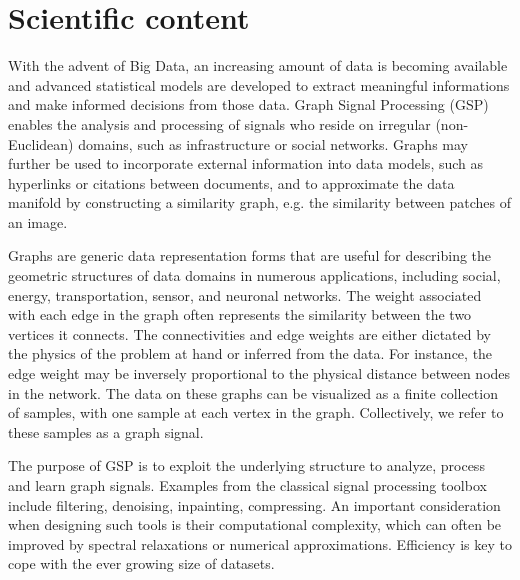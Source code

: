 \documentclass[a4paper]{scrartcl}
\begin{document}
\section{Scientific content}

With the advent of Big Data, an increasing amount of data is becoming available
and advanced statistical models are developed to extract meaningful informations
and make informed decisions from those data. Graph Signal Processing (GSP)
enables the analysis and processing of signals who reside on irregular
(non-Euclidean) domains, such as infrastructure or social networks. Graphs may
further be used to incorporate external information into data models, such as
hyperlinks or citations between documents, and to approximate the data manifold
by constructing a similarity graph, e.g. the similarity between patches of an
image.

Graphs are generic data representation forms that are useful for describing the
geometric structures of data domains in numerous applications, including social,
energy, transportation, sensor, and neuronal networks.
The weight associated with each edge in the graph often represents the
similarity between the two vertices it connects. The connectivities and edge
weights are either dictated by the physics of the problem at hand or inferred
from the data. For instance, the edge weight may be inversely proportional to
the physical distance between nodes in the network.
The data on these graphs can be visualized as a finite collection of samples,
with one sample at each vertex in the graph. Collectively, we refer to these
samples as a graph signal. 

The purpose of GSP is to exploit the underlying structure to analyze, process
and learn graph signals. Examples from the classical signal processing toolbox
include filtering, denoising, inpainting, compressing. An important
consideration when designing such tools is their computational complexity, which
can often be improved by spectral relaxations or numerical approximations.
Efficiency is key to cope with the ever growing size of datasets.
\end{document}
